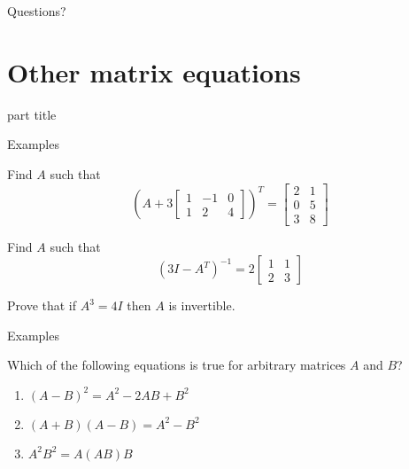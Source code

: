\documentclass{beamer}
\begin{document}
\begin{frame}
  Questions?
\end{frame}

\section{Other matrix equations}

\begin{frame}
  \begin{beamercolorbox}[sep=12pt,center]{part title}
    \insertsection\par
  \end{beamercolorbox}
\end{frame}

\begin{frame}{Examples}
  \begin{example}
    Find $A$ such that
    \begin{equation*}
      \left(A+3 \left[
	\begin{array}{ccc}
          1&-1&0\\
          1&2&4
	\end{array}
      \right]\right)^T=
      \left[
	\begin{array}{cc}
          2&1\\
          0&5\\
          3&8
	\end{array}
      \right]
    \end{equation*}
  \end{example}
  \begin{example}
    Find $A$ such that
    \begin{equation*}
      (3I-A^T)^{-1} = 2\left[
	\begin{array}{cc}
          1&1\\
          2&3
	\end{array}
      \right]
    \end{equation*}
  \end{example}
  \begin{example}
    Prove that if $A^3 = 4I$ then $A$ is invertible.
  \end{example}
\end{frame}

\begin{frame}{Examples}
  \begin{example}
    Which of the following equations is true for arbitrary matrices $A$ and $B$?
    \begin{enumerate}
    \item $(A-B)^2 = A^2-2AB+B^2$
    \item $(A+B)(A-B) = A^2-B^2$
    \item $A^2B^2 = A(AB)B$
    \end{enumerate}
  \end{example}
\end{frame}
\end{document}
